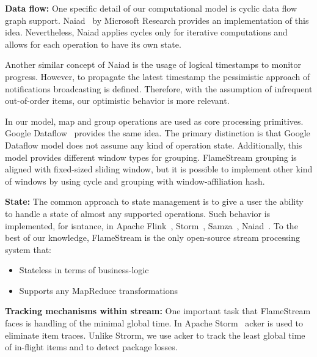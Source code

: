 
\label {fs-related-section}

{\bf Data flow:}
One specific detail of our computational model is cyclic data flow graph support. Naiad~\cite{Murray:2013:NTD:2517349.2522738} by Microsoft Research provides an implementation of this idea. Nevertheless, Naiad applies cycles only for iterative computations and allows for each operation to have its own state. 

Another similar concept of Naiad is the usage of logical timestamps to monitor progress. However, to propagate the latest timestamp the pessimistic approach of notifications broadcasting is defined. Therefore, with the assumption of infrequent out-of-order items, our optimistic behavior is more relevant.

In our model, map and group operations are used as core processing primitives. Google Dataflow~\cite{Akidau:2015:DMP:2824032.2824076} provides the same idea. The primary distinction is that Google Dataflow model does not assume any kind of operation state. Additionally, this model provides different window types for grouping. FlameStream grouping is aligned with fixed-sized sliding window, but it is possible to implement other kind of windows by using cycle and grouping with window-affiliation hash.

{\bf State:}
The common approach to state management is to give a user the ability to handle a state of almost any supported operations. Such behavior is implemented, for isntance, in Apache Flink~\cite{carbone2015apache}, Storm~\cite{apache:storm}, Samza~\cite{Noghabi:2017:SSS:3137765.3137770}, Naiad~\cite{Murray:2013:NTD:2517349.2522738}.
To the best of our knowledge, FlameStream is the only open-source stream processing system that:
\begin{itemize}
    \item Stateless in terms of business-logic
    \item Supports any MapReduce transformations 
\end{itemize}

{\bf Tracking mechanisms within stream:}
One important task that FlameStream faces is handling of the minimal global time. In Apache Storm~\cite{apache:storm} acker is used to eliminate item traces. Unlike Strorm, we use acker to track the least global time of in-flight items and to detect package losses.
